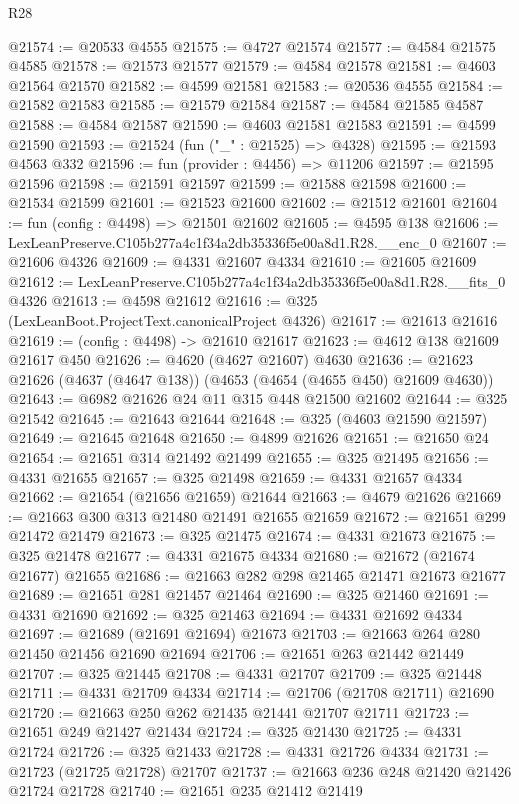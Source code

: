 \begin{lexlean}{R28}
\begin{coremodule}
@21574 := @20533 @4555
@21575 := @4727 @21574
@21577 := @4584 @21575 @4585
@21578 := @21573 @21577
@21579 := @4584 @21578
@21581 := @4603 @21564 @21570
@21582 := @4599 @21581
@21583 := @20536 @4555
@21584 := @21582 @21583
@21585 := @21579 @21584
@21587 := @4584 @21585 @4587
@21588 := @4584 @21587
@21590 := @4603 @21581 @21583
@21591 := @4599 @21590
@21593 := @21524 (fun ("_" : @21525) => @4328)
@21595 := @21593 @4563 @332
@21596 := fun (provider : @4456) => @11206
@21597 := @21595 @21596
@21598 := @21591 @21597
@21599 := @21588 @21598
@21600 := @21534 @21599
@21601 := @21523 @21600
@21602 := @21512 @21601
@21604 := fun (config : @4498) => @21501 @21602
@21605 := @4595 @138
@21606 := LexLeanPreserve.C105b277a4c1f34a2db35336f5e00a8d1.R28.__enc_0
@21607 := @21606 @4326
@21609 := @4331 @21607 @4334
@21610 := @21605 @21609
@21612 := LexLeanPreserve.C105b277a4c1f34a2db35336f5e00a8d1.R28.__fits_0 @4326
@21613 := @4598 @21612
@21616 := @325 (LexLeanBoot.ProjectText.canonicalProject @4326)
@21617 := @21613 @21616
@21619 := (config : @4498) -> @21610 @21617
@21623 := @4612 @138 @21609 @21617 @450
@21626 := @4620 (@4627 @21607) @4630
@21636 := @21623 @21626 (@4637 (@4647 @138)) (@4653 (@4654 (@4655 @450) @21609 @4630))
@21643 := @6982 @21626 @24 @11 @315 @448 @21500 @21602
@21644 := @325 @21542
@21645 := @21643 @21644
@21648 := @325 (@4603 @21590 @21597)
@21649 := @21645 @21648
@21650 := @4899 @21626
@21651 := @21650 @24
@21654 := @21651 @314 @21492 @21499
@21655 := @325 @21495
@21656 := @4331 @21655
@21657 := @325 @21498
@21659 := @4331 @21657 @4334
@21662 := @21654 (@21656 @21659) @21644
@21663 := @4679 @21626
@21669 := @21663 @300 @313 @21480 @21491 @21655 @21659
@21672 := @21651 @299 @21472 @21479
@21673 := @325 @21475
@21674 := @4331 @21673
@21675 := @325 @21478
@21677 := @4331 @21675 @4334
@21680 := @21672 (@21674 @21677) @21655
@21686 := @21663 @282 @298 @21465 @21471 @21673 @21677
@21689 := @21651 @281 @21457 @21464
@21690 := @325 @21460
@21691 := @4331 @21690
@21692 := @325 @21463
@21694 := @4331 @21692 @4334
@21697 := @21689 (@21691 @21694) @21673
@21703 := @21663 @264 @280 @21450 @21456 @21690 @21694
@21706 := @21651 @263 @21442 @21449
@21707 := @325 @21445
@21708 := @4331 @21707
@21709 := @325 @21448
@21711 := @4331 @21709 @4334
@21714 := @21706 (@21708 @21711) @21690
@21720 := @21663 @250 @262 @21435 @21441 @21707 @21711
@21723 := @21651 @249 @21427 @21434
@21724 := @325 @21430
@21725 := @4331 @21724
@21726 := @325 @21433
@21728 := @4331 @21726 @4334
@21731 := @21723 (@21725 @21728) @21707
@21737 := @21663 @236 @248 @21420 @21426 @21724 @21728
@21740 := @21651 @235 @21412 @21419

\end{coremodule}
\end{lexlean}
